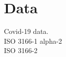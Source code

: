 \section{Data}

Covid-19 data\citep{DeBruin2020}. \\ 
ISO 3166-1 alpha-2 \citep{wiki:iso1}\\ 
ISO 3166-2 \citep{wiki:iso2}